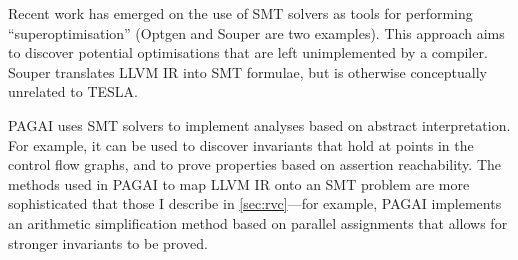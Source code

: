 Recent work has emerged on the use of SMT solvers as tools for performing
``superoptimisation'' (Optgen \cite{buchwald_optgen:_2015} and
Souper \cite{regehr_souper_2017} are two examples). This approach aims to
discover potential optimisations that are left unimplemented by a compiler.
Souper translates LLVM IR into SMT formulae, but is otherwise conceptually
unrelated to TESLA.

PAGAI \cite{henry_pagai:_2012} uses SMT solvers to implement analyses based on
abstract interpretation. For example, it can be used to discover invariants that
hold at points in the control flow graphs, and to prove properties based on
assertion reachability. The methods used in PAGAI to map LLVM IR onto an SMT
problem are more sophisticated that those I describe in \autoref{sec:rvc}---for
example, PAGAI implements an arithmetic simplification method based on parallel
assignments that allows for stronger invariants to be proved.
